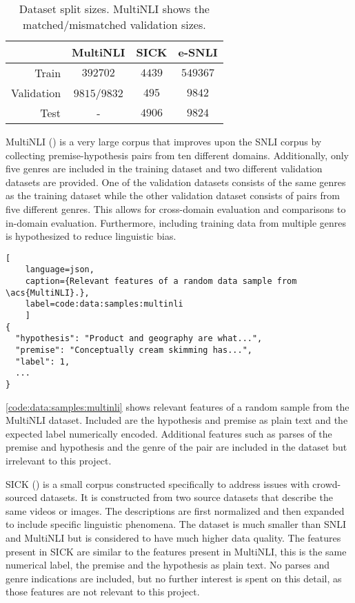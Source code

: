 \documentclass[12pt,a4paper]{article}
\begin{document}
\begin{table}[h]
    \centering
    \caption{Dataset split sizes. \acs{MultiNLI} shows the matched/mismatched validation sizes.}
    \begin{tabular}{r || c | c | c}
        & \acs{MultiNLI} & \acs{SICK} & \acs{e-SNLI} \\
        \hline
        Train & $392702$ & $4439$ & $549367$ \\
        Validation & $9815$/$9832$ & $495$ & $9842$ \\
        Test & - & $4906$ & $9824$
    \end{tabular}
    \label{tab:datasets:sizes}
\end{table}

\Acf{MultiNLI} (\cite{multinli}) is a very large corpus that improves upon the \acs{SNLI} corpus by collecting premise-hypothesis pairs from ten different domains. Additionally, only five genres are included in the training dataset and two different validation datasets are provided. One of the validation datasets consists of the same genres as the training dataset while the other validation dataset consists of pairs from five different genres. This allows for cross-domain evaluation and comparisons to in-domain evaluation. Furthermore, including training data from multiple genres is hypothesized to reduce linguistic bias.

\begin{lstlisting}[
    language=json,
    caption={Relevant features of a random data sample from \acs{MultiNLI}.},
    label=code:data:samples:multinli
    ]
{
  "hypothesis": "Product and geography are what...",
  "premise": "Conceptually cream skimming has...",
  "label": 1,
  ...
}
\end{lstlisting}

\autoref{code:data:samples:multinli} shows relevant features of a random sample from the \ac{MultiNLI} dataset. Included are the hypothesis and premise as plain text and the expected label numerically encoded. Additional features such as parses of the premise and hypothesis and the genre of the pair are included in the dataset but irrelevant to this project.

\Acf{SICK} (\cite{sick}) is a small corpus constructed specifically to address issues with crowd-sourced datasets. It is constructed from two source datasets that describe the same videos or images. The descriptions are first normalized and then expanded to include specific linguistic phenomena. The dataset is much smaller than \acs{SNLI} and \acs{MultiNLI} but is considered to have much higher data quality. The features present in \acs{SICK} are similar to the features present in \acs{MultiNLI}, this is the same numerical label, the premise and the hypothesis as plain text. No parses and genre indications are included, but no further interest is spent on this detail, as those features are not relevant to this project.
\end{document}
